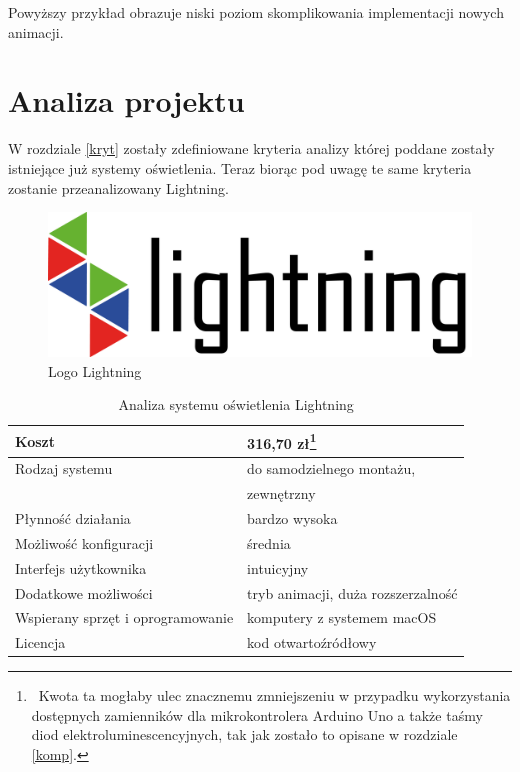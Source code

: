 \documentclass[12pt]{report}
\begin{document}
Powyższy przykład obrazuje niski poziom skomplikowania implementacji nowych animacji.

\section{Analiza projektu}

W rozdziale \ref{kryt} zostały zdefiniowane kryteria analizy której poddane zostały istnie\-jące już systemy oświetlenia. Teraz biorąc pod uwagę te same kryteria zostanie przeanalizowany Lightning.

\begin{figure}[h]
\centering
\includegraphics[width=\textwidth]{../resources/logo.png}
\caption{Logo Lightning}
\end{figure}

\begin{table}[h]
\centering
\begin{tabular}{| l | l |} 
\hline 
Koszt & 316,70 zł\footnote{~Kwota ta mogłaby ulec znacznemu zmniejszeniu w przypadku wykorzystania dostępnych zamienników dla mikrokontrolera Arduino Uno a także taśmy diod elektroluminescencyjnych, tak jak zostało to opisane w rozdziale \ref{komp}.}\\ \hline
Rodzaj systemu & do samodzielnego montażu, \\ \hline
& zewnętrzny \\ \hline
Płynność działania & bardzo wysoka \\ \hline
Możliwość konfiguracji & średnia  \\ \hline
Interfejs użytkownika & intuicyjny  \\ \hline
Dodatkowe możliwości &  tryb animacji, duża rozszerzalność \\ \hline
Wspierany sprzęt i oprogramowanie &  komputery z systemem macOS  \\ \hline
Licencja & kod otwartoźródłowy  \\ \hline
\end{tabular} 
\caption{Analiza systemu oświetlenia Lightning}
\end{table}
\end{document}
